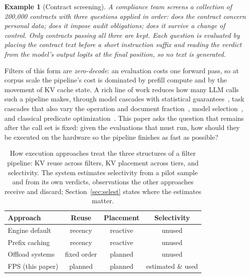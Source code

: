 \documentclass[10pt,twocolumn]{article}
\newtheorem{example}{Example}
\begin{document}
\begin{example}[Contract screening]
\label{ex:contracts}
A compliance team screens a collection of 200{,}000 contracts with three questions applied in order: does the contract concern personal data; does it impose audit obligations; does it survive a change of control. Only contracts passing all three are kept. Each question is evaluated by placing the contract text before a short instruction suffix and reading the verdict from the model's output logits at the final position, so no text is generated.
\end{example}

Filters of this form are \emph{zero-decode}: an evaluation costs one forward pass, so at corpus scale the pipeline's cost is dominated by prefill compute and by the movement of KV cache state. A rich line of work reduces how many LLM calls such a pipeline makes, through model cascades with statistical guarantees~\cite{supg,bargain}, task cascades that also vary the operation and document fraction~\cite{taskcascades}, model selection~\cite{frugalgpt}, and classical predicate optimization~\cite{predmig,probpred}. This paper asks the question that remains after the call set is fixed: given the evaluations that must run, how should they be executed on the hardware so the pipeline finishes as fast as possible?

\begin{table}[t]
\centering
\small
\begin{tabular}{lccc}
\toprule
Approach & Reuse & Placement & Selectivity \\
\midrule
Engine default~\cite{vllm} & recency & reactive & unused \\
Prefix caching~\cite{sglang} & recency & reactive & unused \\
Offload systems~\cite{flexgen} & fixed order & planned & unused \\
FPS (this paper) & planned & planned & estimated \& used \\
\bottomrule
\end{tabular}
\caption{How execution approaches treat the three structures of a filter pipeline: KV reuse across filters, KV placement across tiers, and selectivity. The system estimates selectivity from a pilot sample and from its own verdicts, observations the other approaches receive and discard; Section~\ref{sec:selest} states where the estimates matter.}
\label{tab:approaches}
\end{table}
\end{document}
